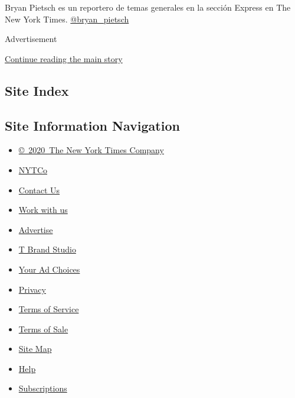 Bryan Pietsch es un reportero de temas generales en la sección Express
en The New York Times.
\href{https://twitter.com/bryan_pietsch}{@bryan\_pietsch}

Advertisement

\protect\hyperlink{after-bottom}{Continue reading the main story}

\hypertarget{site-index}{%
\subsection{Site Index}\label{site-index}}

\hypertarget{site-information-navigation}{%
\subsection{Site Information
Navigation}\label{site-information-navigation}}

\begin{itemize}
\tightlist
\item
  \href{https://help.nytimes3xbfgragh.onion/hc/en-us/articles/115014792127-Copyright-notice}{©~2020~The
  New York Times Company}
\end{itemize}

\begin{itemize}
\tightlist
\item
  \href{https://www.nytco.com/}{NYTCo}
\item
  \href{https://help.nytimes3xbfgragh.onion/hc/en-us/articles/115015385887-Contact-Us}{Contact
  Us}
\item
  \href{https://www.nytco.com/careers/}{Work with us}
\item
  \href{https://nytmediakit.com/}{Advertise}
\item
  \href{http://www.tbrandstudio.com/}{T Brand Studio}
\item
  \href{https://www.nytimes3xbfgragh.onion/privacy/cookie-policy\#how-do-i-manage-trackers}{Your
  Ad Choices}
\item
  \href{https://www.nytimes3xbfgragh.onion/privacy}{Privacy}
\item
  \href{https://help.nytimes3xbfgragh.onion/hc/en-us/articles/115014893428-Terms-of-service}{Terms
  of Service}
\item
  \href{https://help.nytimes3xbfgragh.onion/hc/en-us/articles/115014893968-Terms-of-sale}{Terms
  of Sale}
\item
  \href{https://spiderbites.nytimes3xbfgragh.onion}{Site Map}
\item
  \href{https://help.nytimes3xbfgragh.onion/hc/en-us}{Help}
\item
  \href{https://www.nytimes3xbfgragh.onion/subscription?campaignId=37WXW}{Subscriptions}
\end{itemize}
